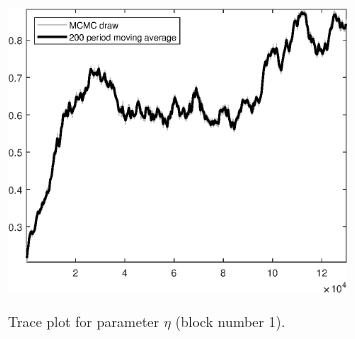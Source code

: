 \begin{figure}[H]
\centering
  \includegraphics[width=0.8\textwidth]{BRS_sectoral_wo_fixed_cost/graphs/TracePlot_eta_blck_1}\\
    \caption{Trace plot for parameter ${\eta}$ (block number 1).}
\end{figure}
